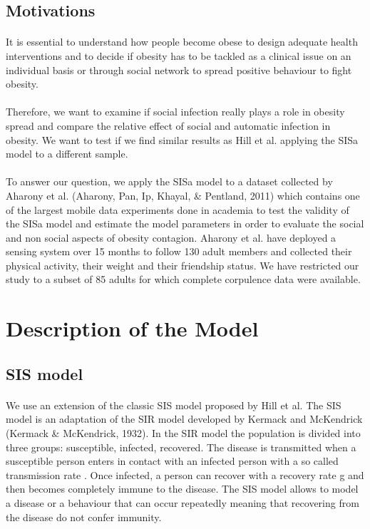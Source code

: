 \documentclass[11pt]{article}
\begin{document}
\subsection{Motivations}
\paragraph{}
It is essential to understand how people become obese to design adequate health interventions and to decide if obesity has to be tackled as a clinical issue on an individual basis or through social network to spread positive behaviour to fight obesity.

\paragraph{}
Therefore, we want to examine if social infection really plays a role in obesity spread and compare the  relative effect of social and automatic infection in obesity. We want to test if we find similar results as Hill et al. applying the SISa model to a different sample.

\paragraph{}
To answer our question, we apply the SISa model to a dataset collected by Aharony et al. (Aharony, Pan, Ip, Khayal, \& Pentland, 2011) which contains one of the largest mobile data experiments done in academia to test the validity of the SISa model and estimate the model parameters in order to evaluate the social and non social aspects of obesity contagion. Aharony et al. have deployed a sensing system over 15 months to follow 130 adult members and collected their physical activity, their weight and their friendship status. We have restricted our study to a subset of 85 adults for which complete corpulence data were available.


\section{Description of the Model}

\subsection{SIS model}
\paragraph{}
We use an extension of the classic SIS model proposed by Hill et al. The SIS model is an adaptation of the SIR model developed by Kermack and McKendrick (Kermack \& McKendrick, 1932). In the SIR model the population is divided into three groups: susceptible, infected, recovered. The disease is transmitted when a susceptible person enters in contact with an infected person with a so called transmission rate \beta. Once infected, a person can recover with a recovery rate g and then becomes completely immune to the disease. The SIS model allows to model a disease or a behaviour that can occur repeatedly meaning that recovering from the disease do not confer immunity.
\end{document}
